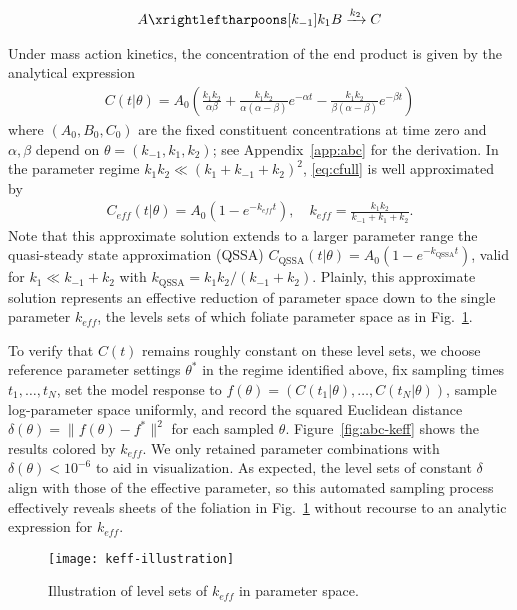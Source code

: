 \begin{align}
  A
  \xrightleftharpoons[k_{-1}]{k_1}
  B
  \xrightarrow[]{k_2}
  C
  \label{mech:abc}
\end{align}

Under mass action kinetics, the concentration of the end product is
given by the analytical expression
% 
\begin{align}
  C(t|\theta)
  =
  A_0
  \left(
  \frac{k_1 k_2}{\alpha \beta}
  +
  \frac{k_1 k_2}{\alpha(\alpha - \beta)}
  e^{-\alpha t}
  -
  \frac{k_1 k_2}{\beta(\alpha - \beta)}
  e^{-\beta t}
  \right)
  \label{eq:cfull}
\end{align}
% 
where $(A_0,B_0,C_0)$ are the fixed constituent concentrations at time
zero and $\alpha,\beta$ depend on $\theta=(k_{-1},k_1,k_2)$; see
Appendix~\ref{app:abc} for the derivation. In the parameter regime
$k_1 k_2 \ll (k_1 + k_{-1} + k_2)^2$, \eqref{eq:cfull} is well
approximated by
% 
\begin{align}
  C_{eff}(t|\theta)
  =
  A_0
  \left(
  1 - e^{-k_{eff} t}
  \right) ,
  \quad
  k_{eff}
  =
  \frac{k_1 k_2}{k_{-1} + k_1 + k_2} .
  \label{ABC-QSSA}
\end{align}
% 
Note that this approximate solution extends to a larger parameter
range the quasi-steady state approximation (QSSA)
$C_\mathrm{QSSA}(t|\theta) = A_0 (1 - e^{-k_\mathrm{QSSA} t})$,
valid for $k_1 \ll k_{-1} + k_2$ with
$k_\mathrm{QSSA}=k_1 k_2/(k_{-1} + k_2)$.  Plainly, this approximate
solution represents an effective reduction of parameter space down to
the single parameter $k_{eff}$, the levels sets of which
foliate parameter space as in Fig.~\ref{fig:abc-ill}.

To verify that $C(t)$ remains roughly constant on these level sets, we
choose reference parameter settings $\theta^*$ in the regime
identified above, fix sampling times $t_1,\ldots,t_N$, set the model
response to $f(\theta)=( C(t_1|\theta) , \ldots , C(t_N|\theta) )$,
sample log-parameter space uniformly, and record the squared Euclidean
distance $\delta(\theta) = \| f(\theta) - f^* \|^2$ for each sampled
$\theta$.  Figure~\ref{fig:abc-keff} shows the results colored by
$k_{eff}$. We only retained parameter combinations with
$\delta(\theta) < 10^{-6}$ to aid in visualization. As expected, the
level sets of constant $\delta$ align with those of the effective
parameter, so this automated sampling process effectively reveals
sheets of the foliation in Fig.~\ref{fig:abc-ill} without recourse to
an analytic expression for $k_{eff}$.

\begin{figure}[ht!]
  \centering
  \texttt{[image: keff-illustration]}
  \caption[Illustration of level sets of the effective parameter in a
  model of chemical kinetics]{Illustration of level sets of $k_{eff}$
    in parameter space. \label{fig:abc-ill} }
\end{figure}


